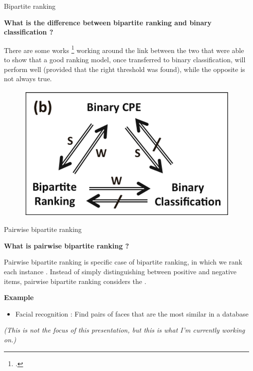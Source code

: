 \begin{frame}{Bipartite ranking}

    {\large\textbf{What is the difference between bipartite ranking and binary classification ?}}

    There are some works \footcite{narasimhan2013relationship} working around the link between the two that were able to show that a good ranking model, once transferred to binary classification, will perform well (provided that the right threshold was found), while the opposite is not always true. 

    \begin{figure}
        \centering
        \includegraphics[scale=0.3]{images/link.png}
    \end{figure}
    
\end{frame}

\begin{frame}{Pairwise bipartite ranking}

    {\large\textbf{What is pairwise bipartite ranking ?}}

    Pairwise bipartite ranking is specific case of bipartite ranking, in which we rank each instance .  Instead of simply distinguishing between positive and negative items, pairwise bipartite ranking considers the . 

    \vspace{0.3cm}

    {\large\textbf{Example}}
    
    \begin{itemize}
        \item Facial recognition : Find pairs of faces that are the most similar in a database
    \end{itemize}

    \textit{(This is not the focus of this presentation, but this is what I'm currently working on.)}

    
\end{frame}


